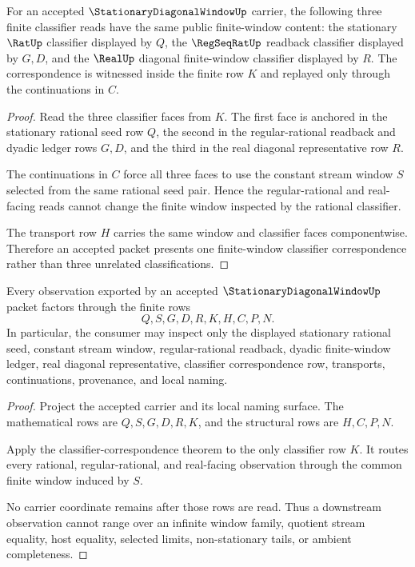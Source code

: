 \begin{theorem}
\label{thm:stationary-diagonal-window-classifier-correspondence}
For an accepted $\StationaryDiagonalWindowUp$ carrier, the following three finite classifier reads have the same public finite-window content: the stationary $\RatUp$ classifier displayed by $Q$, the $\RegSeqRatUp$ readback classifier displayed by $G,D$, and the $\RealUp$ diagonal finite-window classifier displayed by $R$. The correspondence is witnessed inside the finite row $K$ and replayed only through the continuations in $C$.
\end{theorem}
\begin{proof}
Read the three classifier faces from $K$. The first face is anchored in the stationary rational seed row $Q$, the second in the regular-rational readback and dyadic ledger rows $G,D$, and the third in the real diagonal representative row $R$.

The continuations in $C$ force all three faces to use the constant stream window $S$ selected from the same rational seed pair. Hence the regular-rational and real-facing reads cannot change the finite window inspected by the rational classifier.

The transport row $H$ carries the same window and classifier faces componentwise. Therefore an accepted packet presents one finite-window classifier correspondence rather than three unrelated classifications.
\end{proof}

\begin{theorem}
\label{thm:stationary-diagonal-window-finite-window-exhaustion}
Every observation exported by an accepted $\StationaryDiagonalWindowUp$ packet factors through the finite rows
$$
Q,S,G,D,R,K,H,C,P,N.
$$
In particular, the consumer may inspect only the displayed stationary rational seed, constant stream window, regular-rational readback, dyadic finite-window ledger, real diagonal representative, classifier correspondence row, transports, continuations, provenance, and local naming.
\end{theorem}
\begin{proof}
Project the accepted carrier and its local naming surface. The mathematical rows are $Q,S,G,D,R,K$, and the structural rows are $H,C,P,N$.

Apply the classifier-correspondence theorem to the only classifier row $K$. It routes every rational, regular-rational, and real-facing observation through the common finite window induced by $S$.

No carrier coordinate remains after those rows are read. Thus a downstream observation cannot range over an infinite window family, quotient stream equality, host equality, selected limits, non-stationary tails, or ambient completeness.
\end{proof}


